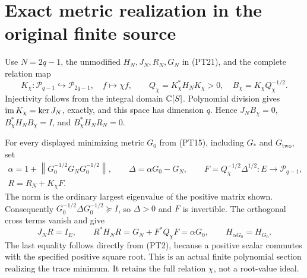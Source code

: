 \documentclass[11pt,a4paper]{article}
\providecommand{\PP}{\mathcal P}
\providecommand{\norm}[1]{\left\lVert#1\right\rVert}
\begin{document}
\section{Exact metric realization in the original finite source}

Use \(N=2q-1\), the unmodified \(H_N,J_N,R_N,G_N\) in
(PT21), and the complete relation map
\begin{equation}\tag{PT27}
 K_\chi:\PP_{q-1}\hookrightarrow\PP_{2q-1},\quad
 f\mapsto\chi f,\qquad
 Q_\chi=K_\chi^*H_NK_\chi>0,\quad
 B_\chi=K_\chi Q_\chi^{-1/2}.
\end{equation}
Injectivity follows from the integral domain \(\mathbb C[S]\).
Polynomial division gives \(\operatorname{im} K_\chi=\ker J_N\), exactly,
and this space has dimension \(q\). Hence
\(J_NB_\chi=0\), \(B_\chi^*H_NB_\chi=I\), and
\(B_\chi^*H_NR_N=0\).

For every displayed minimizing metric \(G_0\) from (PT15),
including \(G_*\) and \(G_{\mathrm{two}}\), set
\begin{equation}\tag{PT28}
 \begin{gathered}
 \alpha=1+\norm{G_0^{-1/2}G_NG_0^{-1/2}},\qquad
 \Delta=\alpha G_0-G_N,\qquad
 F=Q_\chi^{-1/2}\Delta^{1/2}:E\longrightarrow\PP_{q-1},\\
 R=R_N+K_\chi F.
 \end{gathered}
\end{equation}
The norm is the ordinary largest eigenvalue of the positive matrix
shown. Consequently
\(G_0^{-1/2}\Delta G_0^{-1/2}\succeq I\), so \(\Delta>0\)
and \(F\) is invertible. The orthogonal cross terms vanish and give
\begin{equation}\tag{PT29}
 J_NR=I_E,\qquad R^*H_NR=G_N+F^*Q_\chi F
                         =\alpha G_0,\qquad
 H_{\alpha G_0}=H_{G_0}.
\end{equation}
The last equality follows directly from (PT2), because a positive
scalar commutes with the specified positive square root. This is
an actual finite polynomial section realizing the trace minimum.
It retains the full relation \(\chi\), not a root-value ideal.
\end{document}
